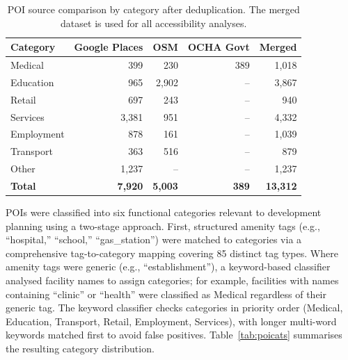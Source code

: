 \documentclass[review,3p,authoryear]{elsarticle}
\begin{document}
\begin{table}[!h]
\centering
\caption{POI source comparison by category after deduplication. The merged dataset is used for all accessibility analyses.}
\label{tab:sourcecomp}
\begin{tabular}{@{}lrrrr@{}}
\toprule
Category & Google Places & OSM & OCHA Govt & Merged \\
\midrule
Medical    & 399   & 230   & 389 & 1,018 \\
Education  & 965   & 2,902 & --  & 3,867 \\
Retail     & 697   & 243   & --  & 940   \\
Services   & 3,381 & 951   & --  & 4,332 \\
Employment & 878   & 161   & --  & 1,039 \\
Transport  & 363   & 516   & --  & 879   \\
Other      & 1,237 & --    & --  & 1,237 \\
\midrule
\textbf{Total} & \textbf{7,920} & \textbf{5,003} & \textbf{389} & \textbf{13,312} \\
\bottomrule
\end{tabular}
\end{table}

POIs were classified into six functional categories relevant to development planning using a two-stage approach. First, structured amenity tags (e.g., ``hospital,'' ``school,'' ``gas\_station'') were matched to categories via a comprehensive tag-to-category mapping covering 85 distinct tag types. Where amenity tags were generic (e.g., ``establishment''), a keyword-based classifier analysed facility names to assign categories; for example, facilities with names containing ``clinic'' or ``health'' were classified as Medical regardless of their generic tag. The keyword classifier checks categories in priority order (Medical, Education, Transport, Retail, Employment, Services), with longer multi-word keywords matched first to avoid false positives. Table~\ref{tab:poicats} summarises the resulting category distribution.
\end{document}
